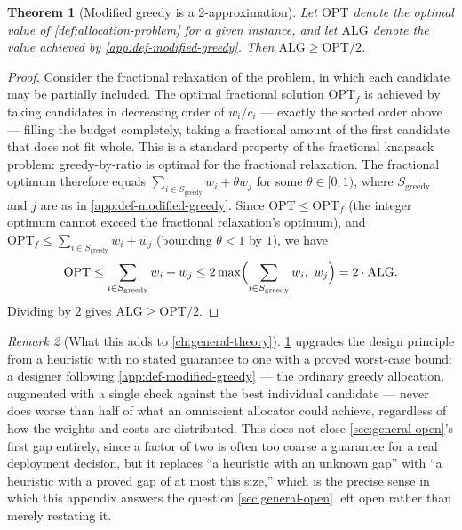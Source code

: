 \documentclass[11pt]{book}
\theoremstyle{plain}
\newtheorem{theorem}{Theorem}[chapter]
\theoremstyle{definition}
\theoremstyle{remark}
\newtheorem{remark}[theorem]{Remark}
\begin{document}
\begin{theorem}[Modified greedy is a 2-approximation]
\label{app:thm-2-approx}
Let $\mathrm{OPT}$ denote the optimal value of
\cref{def:allocation-problem} for a given instance, and let
$\mathrm{ALG}$ denote the value achieved by
\cref{app:def-modified-greedy}. Then $\mathrm{ALG} \geq
\mathrm{OPT}/2$.
\end{theorem}

\begin{proof}
Consider the fractional relaxation of the problem, in which each
candidate may be partially included. The optimal fractional solution
$\mathrm{OPT}_f$ is achieved by taking candidates in decreasing order
of $w_i/c_i$ --- exactly the sorted order above --- filling the budget
completely, taking a fractional amount of the first candidate that
does not fit whole. This is a standard property of the fractional
knapsack problem: greedy-by-ratio is optimal for the fractional
relaxation. The fractional optimum therefore equals $\sum_{i \in
S_{\mathrm{greedy}}} w_i + \theta w_j$ for some $\theta \in [0,1)$,
where $S_{\mathrm{greedy}}$ and $j$ are as in
\cref{app:def-modified-greedy}. Since $\mathrm{OPT} \leq
\mathrm{OPT}_f$ (the integer optimum cannot exceed the fractional
relaxation's optimum), and $\mathrm{OPT}_f \leq \sum_{i \in
S_{\mathrm{greedy}}} w_i + w_j$ (bounding $\theta < 1$ by $1$), we have
\[
\mathrm{OPT} \leq \sum_{i \in S_{\mathrm{greedy}}} w_i + w_j \leq 2 \max\Bigl(\sum_{i \in S_{\mathrm{greedy}}} w_i,\ w_j\Bigr) = 2 \cdot \mathrm{ALG}.
\]
Dividing by $2$ gives $\mathrm{ALG} \geq \mathrm{OPT}/2$.
\end{proof}

\begin{remark}[What this adds to \cref{ch:general-theory}]
\cref{app:thm-2-approx} upgrades the design principle from a heuristic
with no stated guarantee to one with a proved worst-case bound: a
designer following \cref{app:def-modified-greedy} --- the ordinary
greedy allocation, augmented with a single check against the best
individual candidate --- never does worse than half of what an
omniscient allocator could achieve, regardless of how the weights and
costs are distributed. This does not close
\cref{sec:general-open}'s first gap entirely, since a factor of two is
often too coarse a guarantee for a real deployment decision, but it
replaces \enquote{a heuristic with an unknown gap} with \enquote{a
heuristic with a proved gap of at most this size,} which is the
precise sense in which this appendix answers the question
\cref{sec:general-open} left open rather than merely restating it.
\end{remark}
\end{document}
